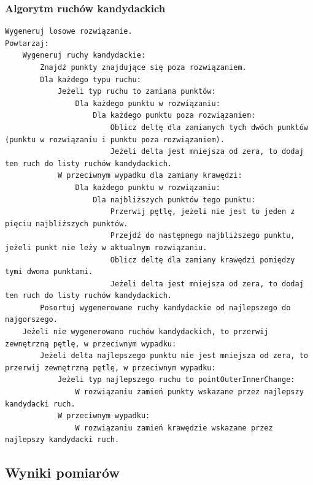 \documentclass[a4paper]{article}
\begin{document}
\subsubsection{Algorytm ruchów kandydackich}

\begin{lstlisting}
Wygeneruj losowe rozwiązanie.
Powtarzaj:
    Wygeneruj ruchy kandydackie:
        Znajdź punkty znajdujące się poza rozwiązaniem.
        Dla każdego typu ruchu:
            Jeżeli typ ruchu to zamiana punktów:
                Dla każdego punktu w rozwiązaniu:
                    Dla każdego punktu poza rozwiązaniem:
                        Oblicz deltę dla zamianych tych dwóch punktów (punktu w rozwiązaniu i punktu poza rozwiązaniem).
                        Jeżeli delta jest mniejsza od zera, to dodaj ten ruch do listy ruchów kandydackich.
            W przeciwnym wypadku dla zamiany krawędzi:
                Dla każdego punktu w rozwiązaniu:
                    Dla najbliższych punktów tego punktu:
                        Przerwij pętlę, jeżeli nie jest to jeden z pięciu najbliższych punktów.
                        Przejdź do następnego najbliższego punktu, jeżeli punkt nie leży w aktualnym rozwiązaniu.
                        Oblicz deltę dla zamiany krawędzi pomiędzy tymi dwoma punktami.
                        Jeżeli delta jest mniejsza od zera, to dodaj ten ruch do listy ruchów kandydackich.
        Posortuj wygenerowane ruchy kandydackie od najlepszego do najgorszego.
    Jeżeli nie wygenerowano ruchów kandydackich, to przerwij zewnętrzną pętlę, w przeciwnym wypadku:
        Jeżeli delta najlepszego punktu nie jest mniejsza od zera, to przerwij zewnętrzną pętlę, w przeciwnym wypadku:
            Jeżeli typ najlepszego ruchu to pointOuterInnerChange:
                W rozwiązaniu zamień punkty wskazane przez najlepszy kandydacki ruch.
            W przeciwnym wypadku:
                W rozwiązaniu zamień krawędzie wskazane przez najlepszy kandydacki ruch.

\end{lstlisting}

\subsection{Wyniki pomiarów}
\end{document}
